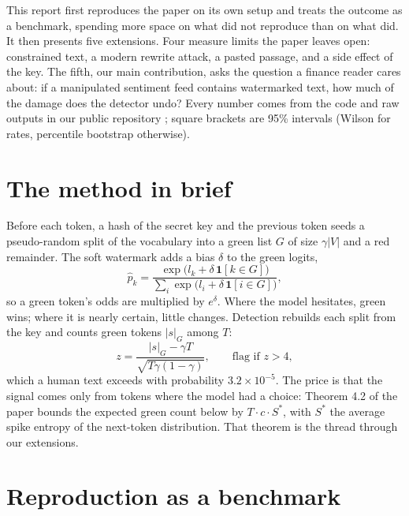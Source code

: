 \documentclass[12pt,letterpaper]{article}
\begin{document}
This report first reproduces the paper on its own setup and treats the outcome as a benchmark, spending more space on what did not reproduce than on what did. It then presents five extensions. Four measure limits the paper leaves open: constrained text, a modern rewrite attack, a pasted passage, and a side effect of the key. The fifth, our main contribution, asks the question a finance reader cares about: if a manipulated sentiment feed contains watermarked text, how much of the damage does the detector undo? Every number comes from the code and raw outputs in our public repository \citep{repo2026}; square brackets are 95\% intervals (Wilson for rates, percentile bootstrap otherwise).

\section{The method in brief}

Before each token, a hash of the secret key and the previous token seeds a pseudo-random split of the vocabulary into a green list $G$ of size $\gamma|V|$ and a red remainder. The soft watermark adds a bias $\delta$ to the green logits,
\begin{equation}
\hat p_k = \frac{\exp\!\big(l_k + \delta\,\mathbf{1}[k \in G]\big)}{\sum_i \exp\!\big(l_i + \delta\,\mathbf{1}[i \in G]\big)},
\end{equation}
so a green token's odds are multiplied by $e^{\delta}$. Where the model hesitates, green wins; where it is nearly certain, little changes. Detection rebuilds each split from the key and counts green tokens $|s|_G$ among $T$:
\begin{equation}
z = \frac{|s|_G - \gamma T}{\sqrt{T\gamma(1-\gamma)}}, \qquad \text{flag if } z > 4,
\end{equation}
which a human text exceeds with probability $3.2 \times 10^{-5}$. The price is that the signal comes only from tokens where the model had a choice: Theorem 4.2 of the paper bounds the expected green count below by $T\cdot c\cdot S^{\ast}$, with $S^{\ast}$ the average spike entropy of the next-token distribution. That theorem is the thread through our extensions.

\section{Reproduction as a benchmark}
\end{document}
